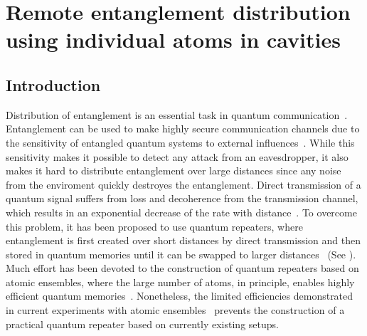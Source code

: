 \chapter{Remote entanglement distribution using individual atoms in
cavities}
\label{ch:Borregaard_PRA2015}
 

\section{Introduction}

Distribution of entanglement is an essential task in quantum
communication~\cite{kimble,cirac, acin}.  Entanglement can be used to make
highly secure communication channels due to the sensitivity of entangled quantum
systems to external influences~\cite{scarani}. While this sensitivity makes it
possible to detect any attack from an eavesdropper, it also makes it hard to
distribute entanglement over large distances since any noise from the enviroment
quickly destroyes the entanglement. Direct transmission of a quantum signal
suffers from loss and decoherence from the transmission channel, which results
in an exponential decrease of the rate with distance~\cite{briegel}. To overcome
this problem, it has been proposed to use quantum repeaters, where entanglement
is first created over short distances by direct transmission and then stored in
quantum memories until it can be swapped to larger
distances~\cite{briegel,duan3} (See ). Much effort has been
devoted to the construction of quantum repeaters based on atomic ensembles,
where the large number of atoms, in principle, enables highly efficient quantum
memories~\cite{sangouard3,cell}. Nonetheless, the limited efficiencies
demonstrated in current experiments with atomic
ensembles~\cite{sangouard3,hammerer} prevents the construction of a practical
quantum repeater based on currently existing setups. 

